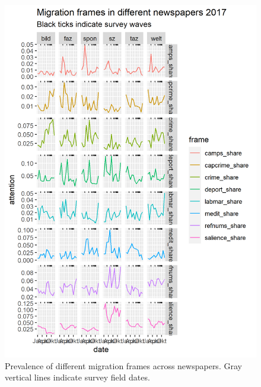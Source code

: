 \documentclass{article}
\begin{document}
\begin{figure}[!ht]
    \centering
    \includegraphics[width=\textwidth]{paper/vis/frames_papers_focus.png}
    \caption{Prevalence of different migration frames across newspapers. Gray vertical lines indicate survey field dates.}
    \label{fig:frames}
\end{figure}
\end{document}
